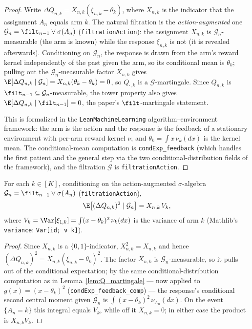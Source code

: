 \begin{proof}\leanok
Write $\Delta Q_{n,k} = X_{n,k}(\xi_{n,k} - \theta_k)$, where $X_{n,k}$ is the
indicator that the assignment $A_n$ equals arm $k$. The natural filtration is the
\emph{action-augmented} one $\mathcal{G}_n = \filt_{n-1}\vee\sigma(A_n)$
(\texttt{filtrationAction}): the assignment $X_{n,k}$ is $\mathcal{G}_n$-measurable
(the arm is known) while the response $\xi_{n,k}$ is not (it is revealed afterwards).
Conditioning on $\mathcal{G}_n$, the response is drawn from the arm's reward kernel
independently of the past given the arm, so its conditional mean is $\theta_k$;
pulling out the $\mathcal{G}_n$-measurable factor $X_{n,k}$ gives
$\E[\Delta Q_{n,k}\mid\mathcal{G}_n] = X_{n,k}(\theta_k-\theta_k)=0$, so $Q_{\cdot,k}$ is
a $\mathcal{G}$-martingale. Since $Q_{n,k}$ is $\filt_{n-1}\subseteq\mathcal{G}_n$-measurable,
the tower property also gives $\E[\Delta Q_{n,k}\mid\filt_{n-1}] = 0$, the paper's
$\filt$-martingale statement.

This is formalized in the \texttt{LeanMachineLearning} algorithm--environment
framework: the arm is the action and the response is the feedback of a stationary
environment with per-arm reward kernel $\nu$, and $\theta_k = \int x\,\nu_k(dx)$ is
the kernel mean. The conditional-mean computation is \texttt{condExp\_feedback}
(which handles the first patient and the general step via the two conditional-distribution
fields of the framework), and the filtration $\mathcal{G}$ is \texttt{filtrationAction}.
\end{proof}

\begin{lemma}\label{lem:Q_cond_second_moment}
\leanok
{}
For each $k \in [K]$, conditioning on the action-augmented $\sigma$-algebra
$\mathcal{G}_n = \filt_{n-1}\vee\sigma(A_n)$ (\texttt{filtrationAction}),
\[
  \E\big[(\Delta Q_{n,k})^2 \mid \mathcal{G}_n\big] = X_{n,k}\, V_k,
\]
where $V_k = \Var[\xi_{1,k}] = \int (x-\theta_k)^2\,\nu_k(dx)$ is the variance of arm $k$
(Mathlib's \texttt{variance}: \texttt{Var[id; ν k]}).
\end{lemma}

\begin{proof}\leanok
Since $X_{n,k}$ is a $\{0,1\}$-indicator, $X_{n,k}^2 = X_{n,k}$ and hence
$(\Delta Q_{n,k})^2 = X_{n,k}(\xi_{n,k}-\theta_k)^2$. The factor $X_{n,k}$ is
$\mathcal{G}_n$-measurable, so it pulls out of the conditional expectation; by the same
conditional-distribution computation as in Lemma~\ref{lem:Q_martingale} --- now applied to
$g(x) = (x-\theta_k)^2$ (\texttt{condExp\_feedback\_comp}) --- the response's conditional
second central moment given $\mathcal{G}_n$ is $\int (x-\theta_k)^2\,\nu_{A_n}(dx)$. On the
event $\{A_n = k\}$ this integral equals $V_k$, while off it $X_{n,k}=0$; in either case
the product is $X_{n,k} V_k$.
\end{proof}

